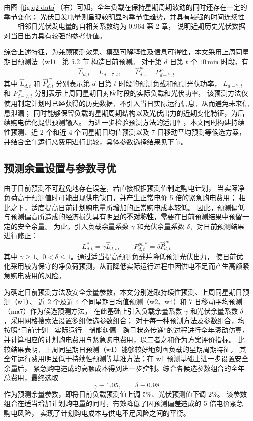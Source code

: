 由图~\ref{fig:q2-data}（右）可知，全年负载在保持星期周期波动的同时还存在一定的季节变化；
光伏日发电量则呈现较明显的季节性趋势，并具有较强的时间连续性——相邻日光伏发电量的自相关系数约为 0.964\cite{fpp3} 第 2 章，
说明近期历史光伏数据对当日出力具有较强的参考价值。

综合上述特征，为兼顾预测效果、模型可解释性及信息可得性，本文采用上周同星期日预测法（w1）\cite{fpp3} 第 5.2 节 构造日前预测。
对于第 $d$ 日第 $t$ 个 $10\,$min 时段，有
\begin{equation}
\hat{L}_{d,t}=L_{d-7,t},\qquad \hat{P}^{pv}_{d,t}=P^{pv}_{d-7,t}
\end{equation}
其中 $\hat{L}_{d,t}$ 和 $\hat{P}^{pv}_{d,t}$ 分别表示第 $d$ 日第 $t$ 时段的预测负载和预测光伏功率，
$L_{d-7,t}$ 和 $P^{pv}_{d-7,t}$ 分别表示上周同星期日对应时段的实际负载和光伏功率。
该预测方法仅使用制定计划时已经获得的历史数据，不引入当日实际运行信息，从而避免未来信息泄漏；
同时能够保留负载的星期周期结构以及光伏出力的近期变化特征，为后续购电优化提供预测输入。
为进一步检验预测方法的适用性，本文同时构建持续性预测、近 2 个和近 4 个同星期日均值预测以及 7 日移动平均预测等候选方案，
并结合全年运行总费用进行比较，具体参数选择结果见下节。

\subsection{预测余量设置与参数寻优}
由于日前预测不可避免地存在误差，若直接根据预测值制定购电计划，
当实际净负荷高于预测值时可能出现供电缺口，并产生正常电价 5 倍的紧急购电费用；
相比之下，适度提高日前计划购电量所增加的正常购电成本较低。
因此，预测偏低与预测偏高所造成的经济损失具有明显的\textbf{不对称性}，需要在日前预测结果中预留一定的安全余量。
为此，引入负载余量系数 $\gamma$ 和光伏余量系数 $\delta$，对日前预测结果进行修正：
\begin{equation}
L^{*}_{d,t}=\gamma\hat{L}_{d,t},\qquad P^{pv,*}_{d,t}=\delta\hat{P}^{pv}_{d,t}
\end{equation}
其中 $\gamma\ge 1$、$0<\delta\le 1$。通过适当提高预测负载并降低预测光伏出力，
使日前优化采用较为保守的净负荷预测，从而降低实际运行过程中因供电不足而产生高额紧急购电费用的风险。

为确定日前预测方法及安全余量参数，本文分别选取持续性预测、上周同星期日预测（w1）、
近 2 个及近 4 个同星期日均值预测（w2、w4）和 7 日移动平均预测（ma7）作为候选预测方法，
在此基础上引入负载余量系数 $\gamma$ 和光伏余量系数 $\delta$，采用网格搜索法设置多组候选参数组合；
对于每一种预测方法及参数组合，均按照“日前计划—实际运行—储能纠偏—跨日状态传递”的过程进行全年滚动仿真，
并计算相应的计划购电费用与紧急购电费用，以二者之和作为方案评价指标。
比较结果表明，上周同星期日预测（w1）能够较好地刻画负载的星期周期特征，
其全年运行费用明显低于持续性预测等基准方法；在 w1 预测基础上进一步设置安全余量后，
紧急购电造成的高额成本得到进一步控制。综合各候选参数组合的全年总费用，最终选取
\begin{equation}
\gamma=1.05,\qquad \delta=0.98
\end{equation}
作为预测余量参数，即将日前负载预测值上调 5\%、光伏预测值下调 2\%。
该参数组合在适当增加计划购电量的同时，有效降低了因预测偏差造成的 5 倍电价紧急购电风险，
实现了计划购电成本与供电不足风险之间的平衡。


